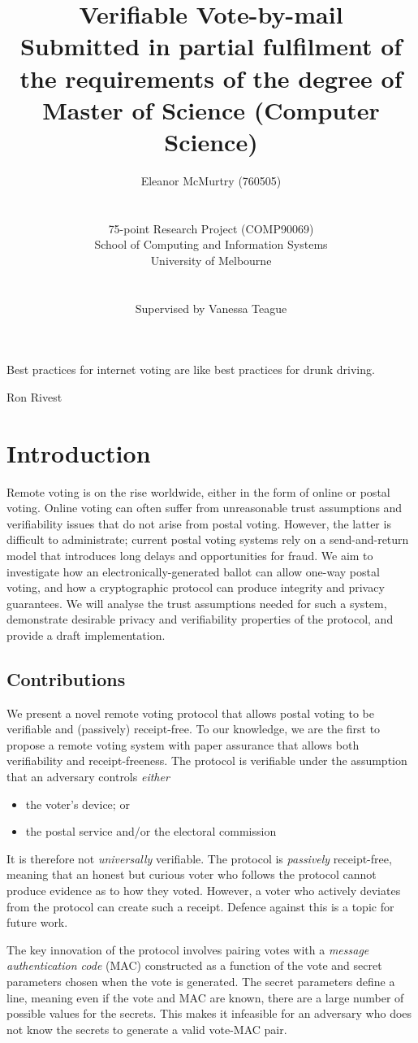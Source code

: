 \documentclass[12pt,a4paper]{article}
\title{Verifiable Vote-by-mail\\\large Submitted in partial fulfilment of the requirements of the degree of\\Master of Science (Computer Science)}
\author{Eleanor McMurtry (760505)\\\\\\75-point Research Project (COMP90069)\\School of Computing and Information Systems\\University of Melbourne\\\\\\Supervised by Vanessa Teague}
\theoremstyle{definition}
\begin{document}
\maketitle
\pagebreak
\tableofcontents
\newpage
\epigraph{Best practices for internet voting are like best practices for drunk driving.}{Ron Rivest}
\section{Introduction}
Remote voting is on the rise worldwide, either in the form of online or postal voting. Online voting can often suffer from unreasonable trust assumptions and verifiability issues that do not arise from postal voting. However, the latter is difficult to administrate; current postal voting systems rely on a send-and-return model that introduces long delays and opportunities for fraud. We aim to investigate how an electronically-generated ballot can allow one-way postal voting, and how a cryptographic protocol can produce integrity and privacy guarantees. We will analyse the trust assumptions needed for such a system, demonstrate desirable privacy and verifiability properties of the protocol, and provide a draft implementation.

\subsection{Contributions}
We present a novel remote voting protocol that allows postal voting to be verifiable and (passively) receipt-free. To our knowledge, we are the first to propose a remote voting system with paper assurance that allows both verifiability and receipt-freeness. The protocol is verifiable under the assumption that an adversary controls \textit{either}
\begin{itemize}
    \item the voter's device; or
    \item the postal service and/or the electoral commission
\end{itemize}
It is therefore not \textit{universally} verifiable. The protocol is \textit{passively} receipt-free, meaning that an honest but curious voter who follows the protocol cannot produce evidence as to how they voted. However, a voter who actively deviates from the protocol can create such a receipt. Defence against this is a topic for future work.

The key innovation of the protocol involves pairing votes with a \textit{message authentication code} (MAC) constructed as a function of the vote and secret parameters chosen when the vote is generated. The secret parameters define a line, meaning even if the vote and MAC are known, there are a large number of possible values for the secrets. This makes it infeasible for an adversary who does not know the secrets to generate a valid vote-MAC pair.
\end{document}
